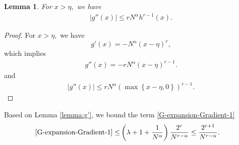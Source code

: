 \documentclass[11pt,oneside,letter]{article}
\newtheorem{lemma}{Lemma}
\begin{document}
\begin{lemma}\label{lemma:g''}
For $x>\eta,$ we have 
\begin{align*}
|g''(x)|\leq r N^{\alpha} h^{r-1}(x).
\end{align*}
\end{lemma}
\begin{proof}
For $x>\eta,$ we have
$$g'(x)=- N^{\alpha} \left(x-\eta\right)^{r} ,$$ which implies
\begin{eqnarray*}
g''(x)= -r N^{\alpha} \left(x-\eta\right)^{r-1}.
\end{eqnarray*}
and
\begin{eqnarray*}
|g''(x)|\leq r N^{\alpha} \left(\max\left\{x-\eta,0\right\}\right)^{r-1}.
\end{eqnarray*}
\end{proof}

Based on Lemma \ref{lemma:g'}, we bound the term \eqref{G-expansion-Gradient-1}
\begin{align}
\eqref{G-expansion-Gradient-1}\leq& \left({\lambda+1}+\frac{1}{{N}^{\alpha}}\right)\frac{2^r}{N^{r-\alpha}} \leq \frac{2^{r+1}}{ N^{r-\alpha}}. \label{Bound-1}
\end{align}
 
\end{document}
